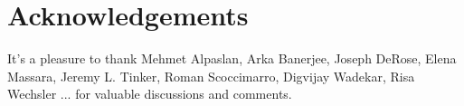 \documentclass[12pt, letterpaper, preprint]{aastex62}
\begin{document}




 





 

\section*{Acknowledgements}
It's a pleasure to thank 
    Mehmet Alpaslan, 
    Arka Banerjee, 
    Joseph DeRose, 
    Elena Massara,
    Jeremy L. Tinker,
    Roman Scoccimarro, 
    Digvijay Wadekar,
    Risa Wechsler
    ...
for valuable discussions and comments. 

\appendix


 
\end{document}
